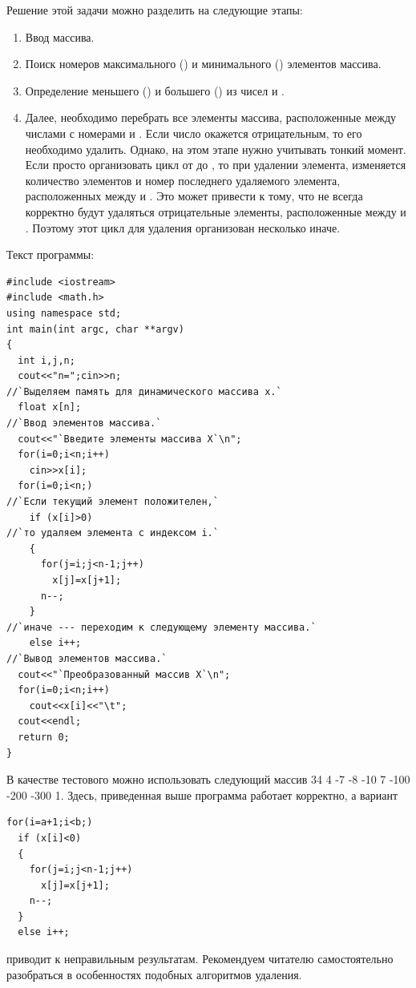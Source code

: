 Решение этой задачи можно разделить на следующие этапы:

\begin{enumerate}
\item Ввод массива.
\item Поиск номеров максимального () и минимального () элементов массива.
\item Определение меньшего () и большего () из чисел  и
.
\item Далее, необходимо перебрать все элементы массива, расположенные между числами с номерами  и
. Если число окажется отрицательным, то его необходимо удалить. Однако, на этом этапе нужно
учитывать тонкий момент. Если просто организовать цикл от  до , то при
удалении элемента, изменяется количество элементов и номер последнего удаляемого элемента, расположенных между
 и . Это может привести к тому, что не всегда корректно будут удаляться
отрицательные элементы, расположенные между  и . Поэтому этот цикл для удаления
организован несколько иначе.
\end{enumerate}

Текст программы:
\begin{lstlisting}
#include <iostream>
#include <math.h>
using namespace std;
int main(int argc, char **argv)
{
  int i,j,n;
  cout<<"n=";cin>>n;
//`Выделяем память для динамического массива x.`
  float x[n];
//`Ввод элементов массива.`
  cout<<"`Введите элементы массива X`\n";
  for(i=0;i<n;i++)
    cin>>x[i];
  for(i=0;i<n;)
//`Если текущий элемент положителен,`
    if (x[i]>0)
//`то удаляем элемента с индексом i.`
    {
      for(j=i;j<n-1;j++)
        x[j]=x[j+1];
      n--;
    }
//`иначе --- переходим к следующему элементу массива.`
    else i++;	
//`Вывод элементов массива.`
  cout<<"`Преобразованный массив X`\n";
  for(i=0;i<n;i++)
    cout<<x[i]<<"\t";
  cout<<endl;
  return 0;
}
\end{lstlisting}


В качестве тестового можно использовать следующий массив 34 4 -7 -8 -10 7 -100 -200 -300 1. Здесь, приведенная
выше программа работает корректно, а вариант 
\begin{lstlisting}
for(i=a+1;i<b;) 
  if (x[i]<0) 
  { 
    for(j=i;j<n-1;j++)
      x[j]=x[j+1]; 
    n--;
  }
  else i++;
\end{lstlisting}
приводит к неправильным результатам. Рекомендуем читателю самостоятельно разобраться в особенностях подобных алгоритмов
удаления.

